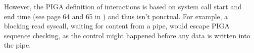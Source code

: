 \documentclass[pdftex,a4paper,titlepage,11pt]{article}
\begin{document}
\bigskip

However, the PIGA definition of interactions is based on system call start and
end time (see page 64 and 65 in \cite{theseJBriffaut}) and thus isn't ponctual.
For example, a blocking read syscall, waiting for content from a pipe, would
escape PIGA sequence checking, as the control might happened before any data is
written into the pipe.

% 
% 
% 
% 
\end{document}
